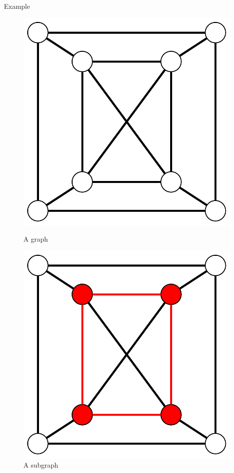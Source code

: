 \documentclass{beamer}
\theoremstyle{plain}
\begin{document}
	\begin{frame}{Example}
		\begin{figure}
			\begin{overprint}
				\centering\includegraphics[scale=.5]{graph.pdf}\caption{A graph}
				\centering\includegraphics[scale=.5]{subgraph.pdf}\caption{A subgraph}

\end{overprint}
\end{figure}
\end{frame}
\end{document}
